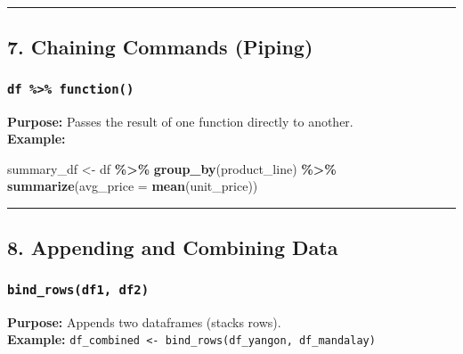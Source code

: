 \documentclass[
  11pt,
]{article}
\newenvironment{Shaded}{\begin{snugshade}}{\end{snugshade}}
\newcommand{\AttributeTok}[1]{\textcolor[rgb]{0.13,0.29,0.53}{#1}}
\newcommand{\FunctionTok}[1]{\textcolor[rgb]{0.13,0.29,0.53}{\textbf{#1}}}
\newcommand{\NormalTok}[1]{#1}
\newcommand{\OtherTok}[1]{\textcolor[rgb]{0.56,0.35,0.01}{#1}}
\newcommand{\SpecialCharTok}[1]{\textcolor[rgb]{0.81,0.36,0.00}{\textbf{#1}}}
\begin{document}
\begin{center}\rule{0.5\linewidth}{0.5pt}\end{center}

\subsection{\texorpdfstring{\textbf{7. Chaining Commands
(Piping)}}{7. Chaining Commands (Piping)}}\label{chaining-commands-piping}

\subsubsection{\texorpdfstring{\textbf{\texttt{df\ \%\textgreater{}\%\ function()}}}{df \%\textgreater\% function()}}\label{df-function}

\textbf{Purpose:} Passes the result of one function directly to
another.\\
\textbf{Example:}

\begin{Shaded}
\begin{Highlighting}[]
\NormalTok{summary\_df }\OtherTok{\textless{}{-}}\NormalTok{ df }\SpecialCharTok{\%\textgreater{}\%}
  \FunctionTok{group\_by}\NormalTok{(product\_line) }\SpecialCharTok{\%\textgreater{}\%}
  \FunctionTok{summarize}\NormalTok{(}\AttributeTok{avg\_price =} \FunctionTok{mean}\NormalTok{(unit\_price))}
\end{Highlighting}
\end{Shaded}

\begin{center}\rule{0.5\linewidth}{0.5pt}\end{center}

\subsection{\texorpdfstring{\textbf{8. Appending and Combining
Data}}{8. Appending and Combining Data}}\label{appending-and-combining-data}

\subsubsection{\texorpdfstring{\textbf{\texttt{bind\_rows(df1,\ df2)}}}{bind\_rows(df1, df2)}}\label{bind_rowsdf1-df2}

\textbf{Purpose:} Appends two dataframes (stacks rows).\\
\textbf{Example:}
\texttt{df\_combined\ \textless{}-\ bind\_rows(df\_yangon,\ df\_mandalay)}
\end{document}
